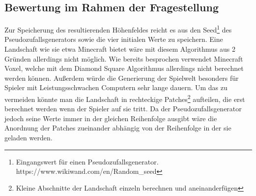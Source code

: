 \subsection{Bewertung im Rahmen der Fragestellung}
Zur Speicherung des resultierenden Höhenfeldes reicht es aus den Seed\footnote{Eingangswert für einen Pseudozufallsgenerator. https://www.wikiwand.com/en/Random\_seed} des Pseudozufallsgenerators sowie die vier initialen Werte zu speichern. Eine Landschaft wie sie etwa Minecraft bietet wäre mit diesem Algorithmus aus 2 Gründen allerdings nicht möglich. Wie bereits besprochen verwendet Minecraft Voxel, welche mit dem Diamond Square Algorithmus allerdings nicht berechnet werden können. Außerdem würde die Generierung der Spielwelt besonders für Spieler mit Leistungsschwachen Computern sehr lange dauern. Um das zu vermeiden könnte man die Landschaft in rechteckige Patches\footnote{Kleine Abschnitte der Landschaft einzeln berechnen und aneinanderfügen} aufteilen, die erst berechnet werden wenn der Spieler auf sie tritt. Da der Pseudozufallsgenerator jedoch seine Werte immer in der gleichen Reihenfolge ausgibt wäre die Anordnung der Patches zueinander abhängig von der Reihenfolge in der sie geladen werden.

